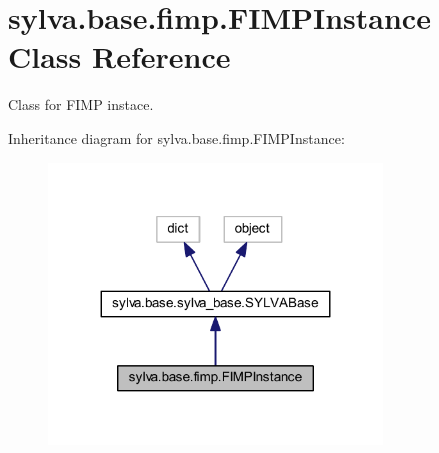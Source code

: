 \hypertarget{classsylva_1_1base_1_1fimp_1_1_f_i_m_p_instance}{}\section{sylva.\+base.\+fimp.\+F\+I\+M\+P\+Instance Class Reference}
\label{classsylva_1_1base_1_1fimp_1_1_f_i_m_p_instance}


Class for F\+I\+MP instace.  




Inheritance diagram for sylva.\+base.\+fimp.\+F\+I\+M\+P\+Instance\+:\nopagebreak
\begin{figure}[H]
\begin{center}
\leavevmode
\includegraphics[width=251pt]{classsylva_1_1base_1_1fimp_1_1_f_i_m_p_instance__inherit__graph}
\end{center}
\end{figure}
